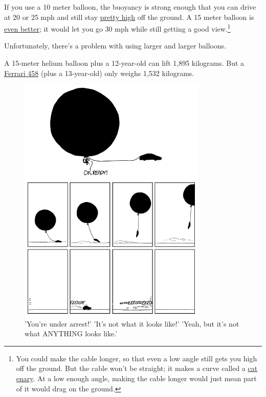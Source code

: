 {{If you use a 10 meter balloon, the buoyancy is strong enough that you can drive at 20 or 25 mph and still stay \href{http://www.wolframalpha.com/input/?i=\%28arctan\%28\%281\%2F6*pi*\%2810+meters\%29\%5E3*\%28air+density+-+helium+density\%29+-+43+kg\%29+\%2F+\%28\%28\%281\%2F8\%29*air+density*pi*\%2810+meters\%29\%5E2*\%2820+mph\%29\%5E2*pi*0.47\%29\%2Fearth+gravity\%29\%29\%29+radians+to+degrees}{pretty high} off the ground. A 15 meter balloon is \href{http://www.wolframalpha.com/input/?i=\%28arctan\%28\%281\%2F6*pi*\%2815+meters\%29\%5E3*\%28air+density+-+helium+density\%29+-+43+kg\%29+\%2F+\%28\%28\%281\%2F8\%29*air+density*pi*\%2815+meters\%29\%5E2*\%2830+mph\%29\%5E2*pi*0.47\%29\%2Fearth+gravity\%29\%29\%29+radians+to+degrees}{even better}; it would let you go 30 mph while still getting a good view.{\footnote{You could make the cable longer, so that even a low angle still gets you high off the ground. But the cable won't be straight; it makes a curve called a \href{http://en.wikipedia.org/wiki/Cat}{cat} \href{http://en.wikipedia.org/wiki/Domestic\_Canary} {enary}. At a low enough angle, making the cable longer would just mean part of it would drag on the ground.} } }

{Unfortunately, there's a problem with using larger and larger balloons.}

{A 15-meter helium balloon plus a 12-year-old can lift 1,895 kilograms. But a \href{http://en.wikipedia.org/wiki/Ferrari\_458}{Ferrari 458} (plus a 13-year-old) only weighs 1,532 kilograms.}

\begin{figure}[!htbp]
\centering
\includegraphics[scale=0.5, max width=0.8\textwidth]{imgs/a/112/arrest.png}
\caption{'You're under arrest!' 'It's not what it looks like!' 'Yeah, but it's not what ANYTHING looks like.'}
\end{figure}

}
